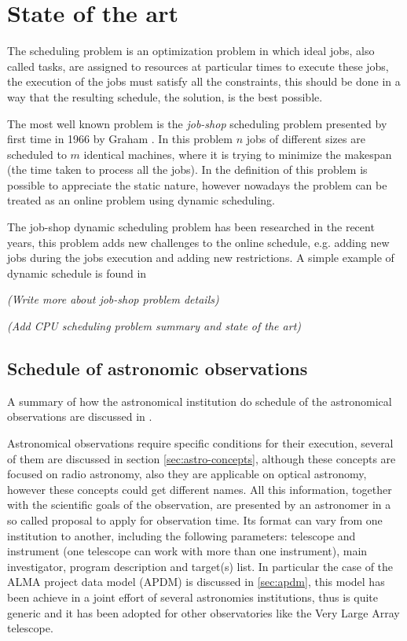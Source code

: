 \documentclass[11pt]{article}
\begin{document}
\newpage
\section{State of the art}
\label{sec:state-of-art}

The scheduling problem is an optimization problem in which ideal jobs, also called tasks, are assigned to resources at particular times to execute these jobs, the execution of the jobs must satisfy all the constraints, this should be done in a way that the resulting schedule, the solution, is the best possible.

The most well known problem is the \textit{job-shop} scheduling problem presented by first time in 1966 by Graham \cite{graham66}. In this problem $n$ jobs of different sizes are scheduled to $m$ identical machines, where it is trying to minimize the makespan (the time taken to process all the jobs). In the definition of this problem is possible to appreciate the static nature, however     nowadays the problem can be treated as an online problem using dynamic scheduling.

The job-shop dynamic scheduling problem has been researched in the recent years, this problem adds new challenges to the online schedule, e.g. adding new jobs during the jobs execution and adding new restrictions. A simple example of dynamic schedule is found in 

\textit{(Write more about job-shop problem details)}

\textit{(Add CPU scheduling problem summary and state of the art)}

\subsection{Schedule of astronomic observations}

A summary of how the astronomical institution do schedule of the astronomical observations are discussed in \cite{mora11}.

Astronomical observations require specific conditions for their execution, several of them are discussed in section \ref{sec:astro-concepts}, although these concepts are focused on radio astronomy, also they are applicable on optical astronomy, however these concepts could get different names. All this information, together with the scientific goals of the observation, are presented by an astronomer in a so called proposal to apply for observation time. Its format can vary from one institution to another, including the following parameters: telescope and instrument (one telescope can work with more than one instrument), main investigator, program description and target(s) list. In particular the case of the ALMA project data model (APDM) is discussed in \ref{sec:apdm}, this model has been achieve in a joint effort of several astronomies institutions, thus is quite generic and it has been adopted for other observatories like the Very Large Array telescope.
\end{document}
